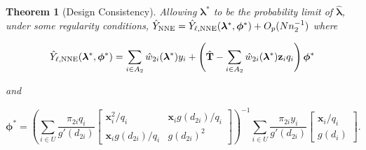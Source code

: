 \documentclass[12pt]{article}
\newtheorem{theorem}{Theorem}
\renewcommand{\bf}[1]{\mathbf{#1}}
\begin{document}
\begin{theorem}[Design Consistency]\label{thm:dc2}
  Allowing $\bm \lambda^*$ to be the probability limit of $\hat{\bm \lambda}$,
  under some regularity conditions, 
  $\hat Y_{\rm NNE} = \hat Y_{\ell, \rm NNE}(\bm \lambda^*,
  \bm \phi^*) + O_p(Nn_2^{-1})$ where

  $$
  \hat Y_{\ell, \rm NNE}(\bm \lambda^*, \bm \phi^*) = \sum_{i \in A_2} \hat w_{2i}(
  \bm \lambda^*) y_i + \left(\hat{\bf T} - \sum_{i \in A_2} \hat w_{2i}(
  \bm \lambda^*) \bf z_i q_i\right) \bm \phi^*
  $$

  and 

  $$
  \bm \phi^* =
  \left(\sum_{i \in U} \frac{\pi_{2i} q_i}{g'(d_{2i})} 
  \begin{bmatrix}
    \bf x_i^2 / q_i & \bf x_i g(d_{2i}) / q_i \\
    \bf x_i g(d_{2i}) / q_i & g(d_{2i})^2
  \end{bmatrix}
  \right)^{-1}
  \sum_{i \in U} \frac{\pi_{2i} y_i}{g'(d_{2i})} 
  \begin{bmatrix} \bf x_i / q_i \\ g(d_i) \end{bmatrix}.
  $$
\end{theorem}
\end{document}
